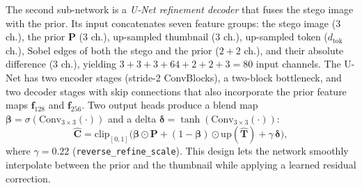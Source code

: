 \documentclass[conference]{IEEEtran}
\begin{document}
The second sub-network is a \emph{U-Net refinement decoder} that fuses the stego image with the prior. Its input concatenates seven feature groups: the stego image ($3$ ch.), the prior $\mathbf{P}$ ($3$ ch.), up-sampled thumbnail ($3$ ch.), up-sampled token ($d_{\text{tok}}$ ch.), Sobel edges of both the stego and the prior ($2{+}2$ ch.), and their absolute difference ($3$ ch.), yielding $3{+}3{+}3{+}64{+}2{+}2{+}3=80$ input channels. The U-Net has two encoder stages (stride-2 ConvBlocks), a two-block bottleneck, and two decoder stages with skip connections that also incorporate the prior feature maps $\mathbf{f}_{128}$ and $\mathbf{f}_{256}$. Two output heads produce a blend map $\boldsymbol{\beta}=\sigma(\text{Conv}_{3\times3}(\cdot))$ and a delta $\boldsymbol{\delta}=\tanh(\text{Conv}_{3\times3}(\cdot))$:
\begin{equation}
    \hat{\mathbf{C}} = \mathrm{clip}_{[0,1]}\!\Big(\boldsymbol{\beta}\odot\mathbf{P} + (1{-}\boldsymbol{\beta})\odot\mathrm{up}(\hat{\mathbf{T}}) + \gamma\,\boldsymbol{\delta}\Big),
    \label{eq:revdec}
\end{equation}
where $\gamma\!=\!0.22$ (\texttt{reverse\_refine\_scale}). This design lets the network smoothly interpolate between the prior and the thumbnail while applying a learned residual correction.
\end{document}
